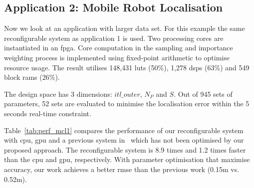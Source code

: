 \subsection{Application 2: Mobile Robot Localisation}

Now we look at an application with larger data set.
For this example the same reconfigurable system as application 1 is used. 
Two processing cores are instantiated in an \gls{fpga}.
Core computation in the sampling and importance weighting process is implemented using fixed-point arithmetic to optimise resource usage.
The result utilises 148,431 \glspl{lut} (50\%), 1,278 \glspl{dsp} (63\%) and 549 block \glspl{ram} (26\%).

The design space has 3 dimensions: $itl\_outer$, $N_P$ and $S$.
Out of 945 sets of parameters, 52 sets are evaluated to minimise the localisation error within the 5 seconds real-time constraint.

Table~\ref{tab:perf_mcl1} compares the performance of our reconfigurable system with \gls{cpu}, \gls{gpu} and a previous system in~\cite{chau13a} 
which has not been optimised by our proposed approach.
The reconfigurable system is 8.9 times and 1.2 times faster than the \gls{cpu} and \gls{gpu}, respectively.
With parameter optimisation that maximise accuracy, our work achieves a better \gls{rmse} than the previous work (0.15m vs. 0.52m).

